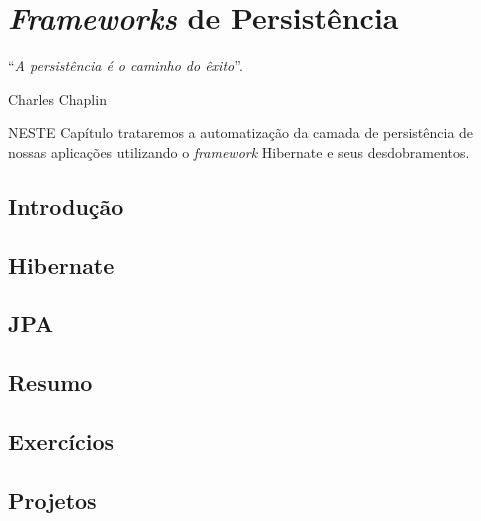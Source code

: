 \chapter{\textit{Frameworks} de Persistência}\label{cap:frameworksPersistencia}
\epigraph{``\textit{A persistência é o caminho do êxito}''.}{Charles Chaplin}

\lettrine[lines=4, lhang=0.1, lraise=0, loversize=0.2, findent=0.1em]{\textcolor{corAzulTema}{N}}{ESTE} Capítulo trataremos a automatização da camada de persistência de nossas aplicações utilizando o \textit{framework} Hibernate e seus desdobramentos.

\section{Introdução}

\section{Hibernate}

\section{JPA}

\section{Resumo}

\section{Exercícios}

\section{Projetos}
